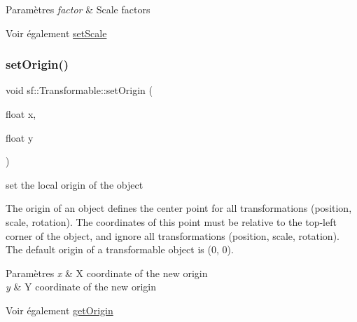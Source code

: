 \begin{DoxyParams}{Paramètres}
{\em factor} & Scale factors\\
\hline
\end{DoxyParams}
\begin{DoxySeeAlso}{Voir également}
\hyperlink{classsf_1_1Transformable_aaec50b46b3f41b054763304d1e727471}{set\+Scale} 
\end{DoxySeeAlso}
\mbox{\label{classsf_1_1Transformable_a56c67bd80aae8418d13fb96c034d25ec}} 
\subsubsection{\texorpdfstring{set\+Origin()}{setOrigin()}\hspace{0.1cm}{\footnotesize\ttfamily [1/2]}}
{\footnotesize\ttfamily void sf\+::\+Transformable\+::set\+Origin (\begin{DoxyParamCaption}\item[{float}]{x,  }\item[{float}]{y }\end{DoxyParamCaption})}



set the local origin of the object 

The origin of an object defines the center point for all transformations (position, scale, rotation). The coordinates of this point must be relative to the top-\/left corner of the object, and ignore all transformations (position, scale, rotation). The default origin of a transformable object is (0, 0).


\begin{DoxyParams}{Paramètres}
{\em x} & X coordinate of the new origin \\
\hline
{\em y} & Y coordinate of the new origin\\
\hline
\end{DoxyParams}
\begin{DoxySeeAlso}{Voir également}
\hyperlink{classsf_1_1Transformable_a37ea3500afac234814a43ce809ef264e}{get\+Origin} 
\end{DoxySeeAlso}
\mbox{\label{classsf_1_1Transformable_aa93a835ffbf3bee2098dfbbc695a7f05}} 
